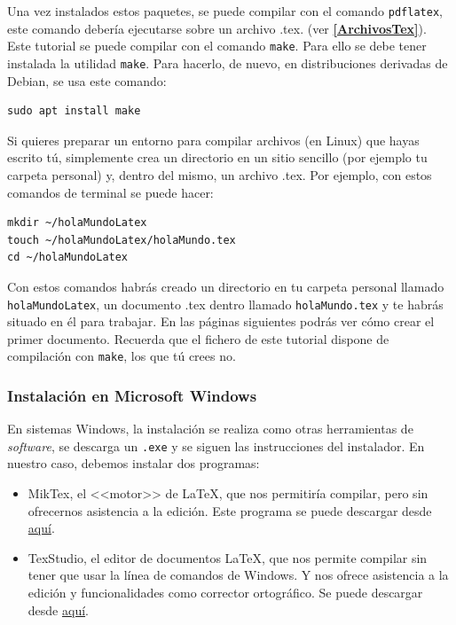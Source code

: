 \documentclass[a4paper]{article}
\begin{document}
Una vez instalados estos paquetes, se puede compilar con el comando
\texttt{pdflatex}, este comando debería ejecutarse sobre un archivo .tex.
(ver \textbf{\ref{ArchivosTex}}). Este tutorial se puede compilar
con el comando \texttt{make}. Para ello se debe tener instalada la utilidad 
\texttt{make}. Para hacerlo, de nuevo, en distribuciones derivadas de
Debian, se usa este comando:
\begin{verbatim}
sudo apt install make
\end{verbatim}

Si quieres preparar un entorno para compilar archivos (en Linux) que hayas
escrito tú, simplemente crea un directorio en un sitio sencillo (por ejemplo tu
carpeta personal) y, dentro del mismo, un archivo .tex. Por ejemplo, con estos
comandos de terminal se puede hacer:
\begin{verbatim}
mkdir ~/holaMundoLatex
touch ~/holaMundoLatex/holaMundo.tex
cd ~/holaMundoLatex
\end{verbatim}

Con estos comandos habrás creado un directorio en tu carpeta personal llamado
\texttt{holaMundoLatex}, un documento .tex dentro llamado \texttt{holaMundo.tex}
y te habrás situado en él para trabajar. En las páginas siguientes podrás ver
cómo crear el primer documento. Recuerda que el fichero de este tutorial dispone
de compilación con \texttt{make}, los que tú crees no.

\subsubsection{Instalación en Microsoft Windows}
En sistemas Windows, la instalación se realiza como otras herramientas de
\textit{software}, se descarga un \texttt{.exe} y se siguen las instrucciones
del instalador. En nuestro caso, debemos instalar dos programas:
\begin{itemize}
    \item MikTex, el <<motor>> de \LaTeX{}, que nos permitiría compilar,
pero sin ofrecernos asistencia a la edición.
Este programa se puede descargar desde \href{https://miktex.org/download}{aquí}. 
    \item TexStudio, el editor de documentos \LaTeX{}, que nos permite compilar
sin tener que usar la línea de comandos de Windows. Y nos ofrece
asistencia a la edición y funcionalidades como corrector ortográfico.
Se puede descargar desde \href{https://www.texstudio.org/}{aquí}.
\end{itemize}
\end{document}
